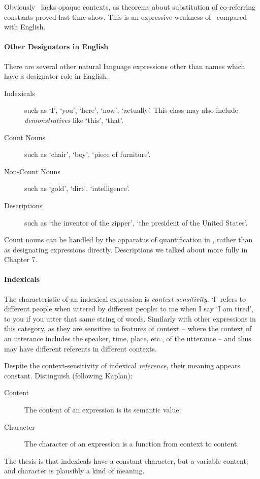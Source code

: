 Obviously \ltwo\ lacks opaque contexts, as theorems about substitution of co-referring constants proved last time show. This is an expressive weakness of \ltwo\ compared with English.



\paragraph{Other Designators in English}

There are several other natural language expressions other than names which have a designator role in English. \begin{description}
	\item [Indexicals] such as `I', `you', `here', `now', `actually'. This class may also include \emph{demonstratives} like `this', `that'.
	\item [Count Nouns] such as `chair', `boy', `piece of furniture'.
	\item [Non-Count Nouns] such as `gold', `dirt', `intelligence'.
	\item [Descriptions] such as `the inventor of the zipper', `the president of the United States'. 
\end{description}

Count nouns can be handled by the apparatus of quantification in \ltwo, rather than as designating expressions directly. Descriptions we talked about  more fully in Chapter 7.

\paragraph{Indexicals}

The characteristic of an indexical expression is \emph{context sensitivity}. `I' refers to different people when uttered by different people: to me when I say `I am tired', to you if you utter that same string of words. Similarly with other expressions in this category, as they are sensitive to features of context – where the context of an utterance includes the speaker, time, place, etc., of the utterance – and thus may have different referents in different contexts.

Despite the context-sensitivity of indexical \emph{reference}, their meaning appears constant. Distinguish (following Kaplan):  \begin{description}
	\item [Content] The content of an expression is its semantic value;
	\item [Character] The character of an expression is a function from context to content.
\end{description} The thesis is that indexicals have a constant character, but a variable content; and character is plausibly a kind of meaning.

